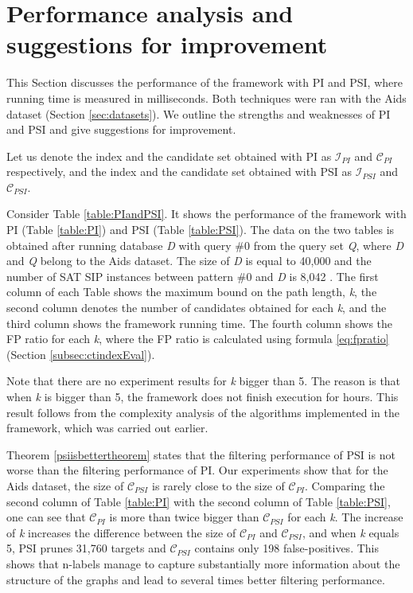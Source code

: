 \documentclass{l4proj}
\newcommand{\fancyI}{\mathcal{I}}
\newcommand{\fancyC}{\mathcal{C}}
\begin{document}
\section{Performance analysis and suggestions for improvement}
\label{sec:performance}
This Section discusses the performance of the framework with PI and PSI, where running time is measured in milliseconds. Both techniques were ran with the Aids dataset (Section \ref{sec:datasets}). We outline the strengths and weaknesses of PI and PSI and give suggestions for improvement.

Let us denote the index and the candidate set obtained with PI as $\fancyI_{PI}$ and $\fancyC_{PI}$ respectively, and the index and the candidate set obtained with PSI as $\fancyI_{PSI}$ and $\fancyC_{PSI}$. 

Consider Table \ref{table:PIandPSI}. It shows the performance of the framework with PI (Table \ref{table:PI}) and PSI (Table \ref{table:PSI}). The data on the two tables is obtained after running database \emph{D} with query \#0 from the query set \emph{Q}, where \emph{D} and \emph{Q} belong to the Aids dataset. The size of \emph{D} is equal to 40,000 and the number of SAT SIP instances between pattern \#0 and \emph{D} is 8,042 \cite{datasets}. The first column of each Table shows the maximum bound on the path length, \emph{k}, the second column denotes the number of candidates obtained for each \emph{k}, and the third column shows the framework running time. The fourth column shows the FP ratio for each \emph{k}, where the FP ratio is calculated using formula \ref{eq:fpratio} (Section \ref{subsec:ctindexEval}).

Note that there are no experiment results for \emph{k} bigger than 5. The reason is that when \emph{k} is bigger than 5, the framework does not finish execution for hours. This result follows from the complexity analysis of the algorithms implemented in the framework, which was carried out earlier. 

Theorem \ref{psiisbettertheorem} states that the filtering performance of PSI is not worse than the filtering performance of PI. Our experiments show that for the Aids dataset, the size of $\fancyC_{PSI}$ is rarely close to the size of $\fancyC_{PI}$. Comparing the second column of Table \ref{table:PI} with the second column of Table \ref{table:PSI}, one can see that $\fancyC_{PI}$ is more than twice bigger than $\fancyC_{PSI}$ for each \emph{k}. The increase of \emph{k} increases the difference between the size of $\fancyC_{PI}$ and $\fancyC_{PSI}$, and when \emph{k} equals 5, PSI prunes 31,760 targets and $\fancyC_{PSI}$ contains only 198 false-positives. This shows that n-labels manage to capture substantially more information about the structure of the graphs and lead to several times better filtering performance.
\end{document}
